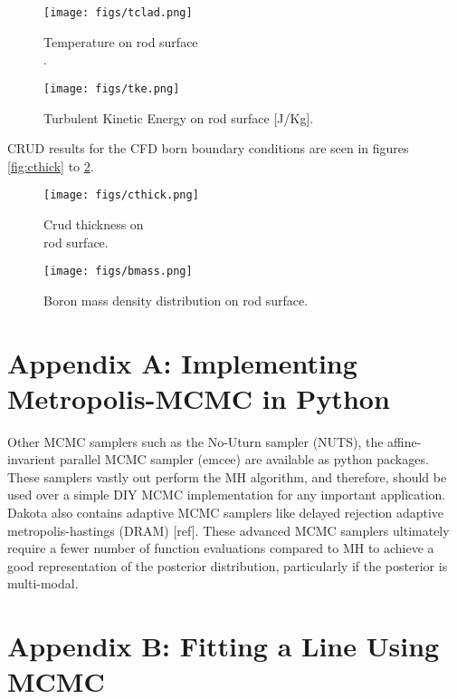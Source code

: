 \documentclass[10pt,a4paper]{report}
\begin{document}
\begin{figure}
    \centering
    \begin{minipage}{.5\textwidth}
        \centering
        \texttt{[image: figs/tclad.png]}
        \caption{Temperature on rod surface \\
        [T]. \label{fig:temp}}
    \end{minipage}%
    \begin{minipage}{.5\textwidth}
        \centering
        \texttt{[image: figs/tke.png]}
        \caption{Turbulent Kinetic Energy on rod surface [J/Kg]. \label{fig:tke}}
    \end{minipage}
\end{figure}
CRUD results for the CFD born boundary conditions are seen in figures \ref{fig:cthick} to \ref{fig:bmass}.
\begin{figure}
    \centering
    \begin{minipage}{.5\textwidth}
        \centering
        \texttt{[image: figs/cthick.png]}
        \caption{Crud thickness on \\
        rod surface. \label{fig:cthick}}
    \end{minipage}%
    \begin{minipage}{.5\textwidth}
        \centering
        \texttt{[image: figs/bmass.png]}
        \caption{Boron mass density distribution on rod surface. \label{fig:bmass}}
    \end{minipage}
\end{figure}


\chapter{Appendix A: Implementing Metropolis-MCMC in Python}

Other MCMC samplers such as the No-Uturn sampler (NUTS), the affine-invarient parallel MCMC sampler (emcee) are available as python packages.  These samplers vastly out perform the MH algorithm, and therefore, should be used over a simple DIY MCMC implementation for any important application.  Dakota also contains adaptive MCMC samplers like delayed rejection adaptive metropolis-hastings (DRAM) [ref].  These advanced MCMC samplers ultimately require a fewer number of function evaluations compared to MH to achieve a good representation of the posterior distribution, particularly if the posterior is multi-modal.

\chapter{Appendix B: Fitting a Line Using MCMC}
\end{document}
